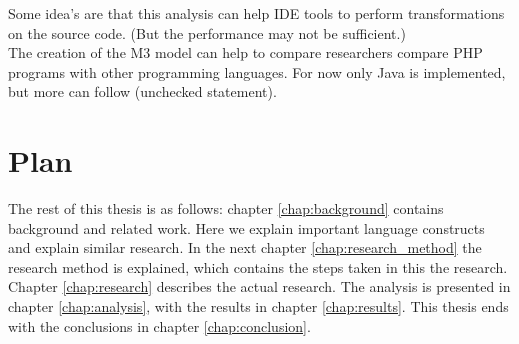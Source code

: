 \documentclass[../main.tex]{subfiles}
\begin{document}
        Some idea's are that this analysis can help IDE tools to perform transformations on the source code.
        (But the performance may not be sufficient.)
        \\
        The creation of the M3 model can help to compare researchers compare PHP programs with other programming languages. For now only Java is implemented, but more can follow (unchecked statement).
    
    \section{Plan} %
        The rest of this thesis is as follows:
        chapter \ref{chap:background} contains background and related work.
        Here we explain important language constructs and explain similar research.
        In the next chapter \ref{chap:research_method} the research method is explained, which contains the steps taken in this the research.
        Chapter \ref{chap:research} describes the actual research. 
        The analysis is presented in chapter \ref{chap:analysis}, with the results in chapter \ref{chap:results}.
        This thesis ends with the conclusions in chapter \ref{chap:conclusion}.
        
        
\end{document}
